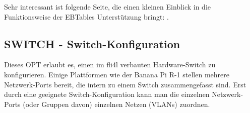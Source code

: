 Sehr interessant ist folgende Seite, die einen kleinen Einblick in die
Funktionsweise der EBTables Unterstützung bringt:
.

{
\subsection {SWITCH - Switch-Konfiguration}
}

Dieses OPT erlaubt es, einen im fli4l verbauten Hardware-Switch zu
konfigurieren. Einige Plattformen wie der Banana Pi R-1 stellen mehrere
Netzwerk-Ports bereit, die intern zu einem Switch zusammengefasst sind. Erst
durch eine geeignete Switch-Konfiguration kann man die einzelnen Netzwerk-Ports
(oder Gruppen davon) einzelnen Netzen (VLANs) zuordnen.

